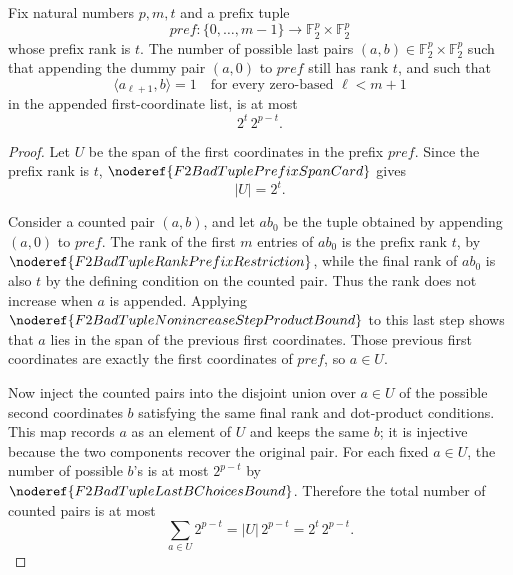 \begin{helper}
Fix natural numbers \(p,m,t\) and a prefix tuple
\[
  pref:\{0,\ldots,m-1\}\to \mathbb F_2^p\times\mathbb F_2^p
\]
whose prefix rank is \(t\). The number of possible last pairs
\((a,b)\in\mathbb F_2^p\times\mathbb F_2^p\) such that appending the dummy pair
\((a,0)\) to \(pref\) still has rank \(t\), and such that
\[
  \langle a_{\ell+1},b\rangle=1
  \quad\text{for every zero-based }\ell<m+1
\]
in the appended first-coordinate list, is at most
\[
  2^t\,2^{p-t}.
\]
\end{helper}
\begin{proof}
Let \(U\) be the span of the first coordinates in the prefix \(pref\). Since
the prefix rank is \(t\), \(\noderef{F2BadTuplePrefixSpanCard}\) gives
\[
  |U|=2^t.
\]

Consider a counted pair \((a,b)\), and let \(ab_0\) be the tuple obtained by
appending \((a,0)\) to \(pref\). The rank of the first \(m\) entries of
\(ab_0\) is the prefix rank \(t\), by
\(\noderef{F2BadTupleRankPrefixRestriction}\), while the final rank of \(ab_0\)
is also \(t\) by the defining condition on the counted pair. Thus the rank
does not increase when \(a\) is appended. Applying
\(\noderef{F2BadTupleNonincreaseStepProductBound}\) to this last step shows
that \(a\) lies in the span of the previous first coordinates. Those previous
first coordinates are exactly the first coordinates of \(pref\), so \(a\in U\).

Now inject the counted pairs into the disjoint union over \(a\in U\) of the
possible second coordinates \(b\) satisfying the same final rank and
dot-product conditions. This map records \(a\) as an element of \(U\) and keeps
the same \(b\); it is injective because the two components recover the original
pair. For each fixed \(a\in U\), the number of possible \(b\)'s is at most
\(2^{p-t}\) by \(\noderef{F2BadTupleLastBChoicesBound}\). Therefore the total
number of counted pairs is at most
\[
  \sum_{a\in U} 2^{p-t}=|U|\,2^{p-t}=2^t\,2^{p-t}.
\]
\end{proof}
